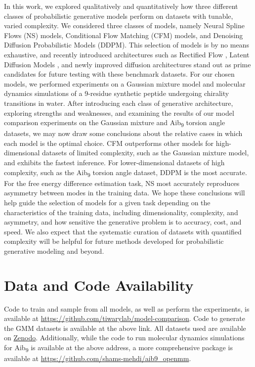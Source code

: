 \documentclass[%
 aip,
 amsmath,amssymb,
 reprint,%
]{revtex4-1}
\begin{document}
{In this work, we explored qualitatively and quantitatively how three different classes of probabilistic generative models perform on datasets with tunable, varied complexity. We considered three classes of models, namely Neural Spline Flows (NS) models, Conditional Flow Matching (CFM) models, and Denoising Diffusion Probabilistic Models (DDPM). This selection of models is by no means exhaustive, and recently introduced architectures such as Rectified Flow \cite{rect-flow}, Latent Diffusion Models \cite{rombach2022high}, and newly improved diffusion architectures \cite{karras2022elucidating} stand out as prime candidates for future testing with these benchmark datasets. For our chosen models, we performed experiments on a Gaussian mixture model and molecular dynamics simulations of a 9-residue synthetic peptide undergoing chirality transitions in water. 
After introducing each class of generative architecture, exploring strengths and weaknesses, and examining the results of our model comparison experiments on the Gaussian mixture and Aib\textsubscript{9} torsion angle datasets, we may now draw some conclusions about the relative cases in which each model is the optimal choice. CFM outperforms other models for high-dimensional datasets of limited complexity, such as the Gaussian mixture model, and exhibits the fastest inference. For lower-dimensional datasets of high complexity, such as the  Aib\textsubscript{9} torsion angle dataset, DDPM is the most accurate. For the free energy difference estimation task, NS most accurately reproduces asymmetry between modes in the training data. We hope these conclusions will help guide the selection of models for a given task depending on the characteristics of the training data, including dimensionality, complexity, and asymmetry, and how sensitive the generative problem is to accuracy, cost, and speed. We also expect that the systematic curation of datasets with quantified complexity will be helpful for future methods developed for probabilistic generative modeling and beyond.

\section{Data and Code Availability}
\label{sec:availability}

Code to train and sample from all models, as well as perform the experiments, is available at \url{https://github.com/tiwarylab/model-comparison}. Code to generate the GMM datasets is available at the above link. All datasets used are available on
\href{https://zenodo.org/records/14143082?token=eyJhbGciOiJIUzUxMiJ9.eyJpZCI6IjAyYmYzODhlLWE2ZjYtNDA4NS1iNDhlLTJlNzZmMzcyNzMwZCIsImRhdGEiOnt9LCJyYW5kb20iOiI0YTE3NTE3N2Y4MThkODg0YTY4NTI4OWExMGE3NmNmNiJ9.HcFgvUV0sK8EhJm0Ow8cFn-56q8rGuSWj_LBQIcpzMZ_mAySqnJ4pJeJubxw_3Dtl2chUoHAGOaxgaRFyZRLWg}{Zenodo}. Additionally, while the code to run molecular dynamics simulations for Aib\textsubscript{9} is available at the above address, a more comprehensive package is available at \url{https://github.com/shams-mehdi/aib9_openmm}.

}
\end{document}
